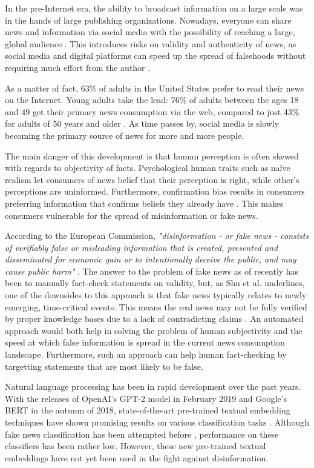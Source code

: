 In the pre-Internet era, the ability to broadcast information on a large scale was in the hands of large publishing organizations. 
Nowadays, everyone can share news and information via social media with the possibility of reaching a large, global audience \cite{howell2013}. 
This introduces risks on validity and authenticity of news, as social media and digital platforms can speed up the spread of falsehoods without requiring much effort from the author \cite{europeancommission2018}. 

As a matter of fact, 63\% of adults in the United States prefer to read their news on the Internet. 
Young adults take the lead: 76\% of adults between the ages 18 and 49 get their primary news consumption via the web, compared to just 43\% for adults of 50 years and older \cite{mitchell2018}.
As time passes by, social media is slowly becoming the primary source of news for more and more people. 

The main danger of this development is that human perception is often skewed with regards to objectivity of facts. 
Psychological human traits such as naïve realism let consumers of news belief that their perception is right, while other's perceptions are uninformed. 
Furthermore, confirmation bias results in consumers preferring information that confirms beliefs they already have \cite{shu2017}. 
This makes consumers vulnerable for the spread of misinformation or fake news. 

According to the European Commission, \textit{"disinformation - or fake news - consists of verifiably false or misleading information that is created, presented and disseminated for economic gain or to intentionally deceive the public, and may cause public harm"} \cite{europeancommission2018}. 
The answer to the problem of fake news as of recently has been to manually fact-check statements on validity, but, as Shu et al. underlines, one of the downsides to this approach is that fake news typically relates to newly emerging, time-critical events. 
This means the real news may not be fully verified by proper knowledge bases due to a lack of contradicting claims \cite{shu2017}. 
An automated approach would both help in solving the problem of human subjectivity and the speed at which false information is spread in the current news consumption landscape.
Furthermore, such an approach can help human fact-checking by targetting statements that are most likely to be false.

Natural language processing has been in rapid development over the past years. 
With the releases of OpenAI's GPT-2 model in February 2019 and Google's BERT in the autumn of 2018, state-of-the-art pre-trained textual embedding techniques have shown promising results on various classification tasks \cite{radford2019,devlin2018}. 
Although fake news classification has been attempted before \cite{wang2018,khurana2017}, performance on these classifiers has been rather low. 
However, these new pre-trained textual embeddings have not yet been used in the fight against disinformation. 

